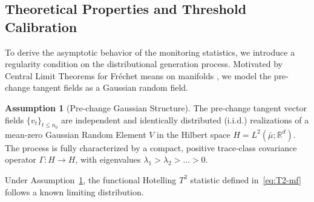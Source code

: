 \documentclass{article}
\theoremstyle{plain}
\theoremstyle{definition}
\newtheorem{assumption}[theorem]{Assumption}
\theoremstyle{remark}
\begin{document}

\subsection{Theoretical Properties and Threshold Calibration}\label{sec:theory_calibration}
To derive the asymptotic behavior of the monitoring statistics, we introduce a regularity condition on the distributional generation process. 
Motivated by Central Limit Theorems for Fr\'echet means on manifolds \citep{bhattacharya2008statistics, mattingly2023central}, we model the pre-change tangent fields as a Gaussian random field.
\begin{assumption}[Pre-change Gaussian Structure]\label{ass:gaussian_process}
The pre-change tangent vector fields $\{v_t\}_{t \le n_0}$ are independent and identically distributed (i.i.d.) realizations of a mean-zero Gaussian Random Element $V$ in the Hilbert space $H = L^2(\bar{\mu}; \mathbb{R}^d)$. 
The process is fully characterized by a compact, positive trace-class covariance operator $\Gamma: H \to H$, with eigenvalues $\lambda_1 > \lambda_2 > \dots > 0$.
\end{assumption}
Under Assumption~\ref{ass:gaussian_process}, the functional Hotelling $T^2$ statistic defined in~\cref{eq:T2-mf} follows a known limiting distribution.
\end{document}
